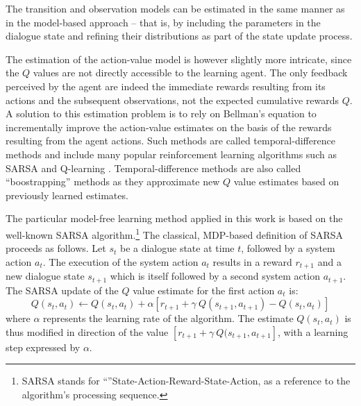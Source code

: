 The transition and observation models can be estimated in the same manner as in the model-based approach -- that is, by including the parameters in the dialogue state and refining their distributions as part of the state update process. 

The estimation of the action-value model is however slightly more intricate, since the $Q$ values are not directly accessible to the learning agent.  The only feedback perceived by the agent are indeed the immediate rewards resulting from its actions and the subsequent observations, not the expected cumulative rewards $Q$.  A solution to this estimation problem is to rely on Bellman's equation to incrementally improve the action-value estimates on the basis of the rewards resulting from the agent actions. Such methods are called temporal-difference methods and include many popular reinforcement learning algorithms such as SARSA and Q-learning \citep{citeulike:112017}. Temporal-difference methods are also called ``boostrapping'' methods as they approximate new $Q$ value estimates based on previously learned estimates.

The particular model-free learning method applied in this work is based on the well-known SARSA algorithm.\footnote{SARSA stands for ``''State-Action-Reward-State-Action, as a reference to the algorithm's processing sequence.} The classical, MDP-based definition of SARSA proceeds as follows. Let $s_t$ be a dialogue state at time $t$, followed by a system action $a_t$. The execution of the system action $a_t$ results in a reward $r_{t+1}$ and a new dialogue state $s_{t+1}$ which is itself followed by a second system action $a_{t+1}$.  The SARSA update of the $Q$ value estimate for the first action $a_t$ is:
\begin{equation}
Q(s_t, a_t) \leftarrow Q(s_t,a_t) + \alpha \left[r_{t+1} + \gamma \ Q(s_{t+1}, a_{t+1}) - Q(s_t, a_t) \right] 
\end{equation}
where $\alpha$ represents the learning rate of the algorithm. The estimate $Q(s_t, a_t)$ is thus modified in direction of the value $ \left[r_{t+1} + \gamma \ Q(s_{t+1}, a_{t+1} \right]$, with a learning step expressed by $\alpha$. 


